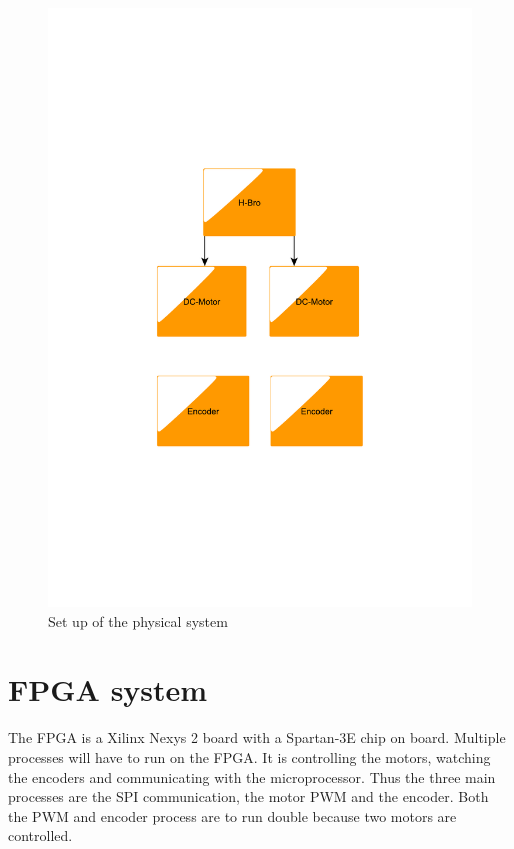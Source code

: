 \begin{figure}[htb]
	\centering
	\includegraphics[scale=0.3,trim=200 200 200 200]{graphics/phsycicalsystem} %
	\caption{Set up of the physical system}
	\label{fig:phsysicalsystem}			%
\end{figure}

\section{FPGA system}\label{sec:FPGA}

The FPGA is a Xilinx Nexys 2 board with a Spartan-3E chip on board. Multiple processes will have to run on the FPGA. It is controlling the motors, watching the encoders and communicating with the microprocessor. Thus the three main processes are the SPI communication, the motor PWM and the encoder. Both the PWM and encoder process are to run double because two motors are controlled. 

